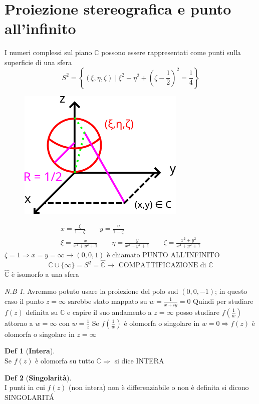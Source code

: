 \documentclass[a4paper,11pt]{report}
\theoremstyle{remark}
\newtheorem*{nb}{N.B}
\theoremstyle{definition}
\newtheorem*{Def}{Def}
\newcommand{\C}{\mathbb{C}}
\begin{document}
\section{Proiezione stereografica e punto all'infinito}
I numeri complessi sul piano $\C$ possono essere rappresentati come punti sulla superficie di una sfera
\[S^2 = \left\{(\xi,\eta,\zeta) \; \Bigr| \; \xi^2 + \eta^2 + {\left(\zeta - \frac{1}{2}\right)}^2 = \frac{1}{4}\right\}\]
\begin{figure}[H]
	\centering
	\includegraphics[width=0.6\linewidth]{immagini/sfera}
	\label{fig:sfera}
\end{figure}
\begin{gather*}
	x = \frac{\xi}{1-\zeta} \qquad y = \frac{\eta}{1-\zeta} \\
	\xi = \frac{x}{x^2+y^2+1} \qquad \eta = \frac{y}{x^2+y^2+1} \qquad \zeta = \frac{x^2+y^2}{x^2+y^2+1}
\end{gather*}
\noindent $\zeta =1 \Rightarrow x=y=\infty  \rightarrow (0,0,1)$ è chiamato PUNTO ALL'INFINITO 
\[\C \cup \{\infty\} = S^2 = \hat{\C} \rightarrow \text{ COMPATTIFICAZIONE di } \C\]
$\hat{\C}$ è isomorfo a una sfera
\begin{nb}
	Avremmo potuto usare la proiezione del polo sud $(0,0,-1)$; in questo caso il punto $z=\infty$ sarebbe stato mappato su $w = \frac{1}{x+iy}=0$ \newline
	Quindi per studiare $f(z)$ definita su $\C$ e capire il suo andamento a $z=\infty$ posso studiare $f\left(\frac{1}{w}\right)$ attorno a $w=\infty$ con $w=\frac{1}{z}$ \newline
	Se $f\left(\frac{1}{w}\right)$ è olomorfa o singolare in $w=0 \Rightarrow f(z)$ è olomorfa o singolare in $z=\infty$ 
\end{nb}
\begin{Def}[\textbf{Intera}]\hfil\\
	Se $f(z)$ è olomorfa su tutto $\C \Rightarrow$ si dice INTERA	 
\end{Def}
\begin{Def}[\textbf{Singolarità}]\hfil\\
	I punti in cui $f(z)$ (non intera) non è differenziabile o non è definita si dicono SINGOLARIT\'A
\end{Def}
\end{document}

